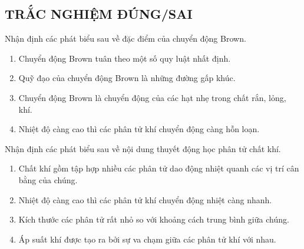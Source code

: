 \subsection{TRẮC NGHIỆM ĐÚNG/SAI}
\setcounter{ex}{0}
\begin{ex}
	Nhận định các phát biểu sau về đặc điểm của chuyển động Brown.
	\begin{enumerate}[label=\alph*)]
	\item Chuyển động Brown tuân theo một số quy luật nhất định.
	\item Quỹ đạo của chuyển động Brown là những đường gấp khúc.
	\item Chuyển động Brown là chuyển động của các hạt nhẹ trong chất rắn, lỏng, khí.
	\item Nhiệt độ càng cao thì các phân tử khí chuyển động càng hỗn loạn.
\end{enumerate}
\end{ex}
\begin{ex}
	Nhận định các phát biểu sau về nội dung thuyết động học phân tử chất khí.
	\begin{enumerate}[label=\alph*)]
		\item Chất khí gồm tập hợp nhiều các phân tử dao động nhiệt quanh các vị trí cân bằng của chúng.
		\item Nhiệt độ càng cao thì các phân tử khí chuyển động nhiệt càng nhanh.
		\item Kích thước các phân tử rất nhỏ so với khoảng cách trung bình giữa chúng.
		\item Áp suất khí được tạo ra bởi sự va chạm giữa các phân tử khí với nhau.
	\end{enumerate}
\end{ex}
